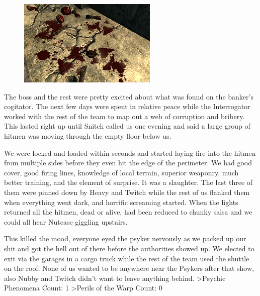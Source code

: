 \begin{figure}
	\begin{center}
		\includegraphics[width=\figwidth]{pics/3/11.png}
	\end{center}
\end{figure}
The boss and the rest were pretty excited about what was found on the banker’s cogitator. 
The next few days were spent in relative peace while the Interrogator worked with the rest of the team to map out a web of corruption and bribery. 
This lasted right up until Snitch called us one evening and said a large group of hitmen was moving through the empty floor below us.

We were locked and loaded within seconds and started laying fire into the hitmen from multiple sides before they even hit the edge of the perimeter. 
We had good cover, good firing lines, knowledge of local terrain, superior weaponry, much better training, and the element of surprise. 
It was a slaughter. 
The last three of them were pinned down by Heavy and Twitch while the rest of us flanked them when everything went dark, and horrific screaming started. 
When the lights returned all the hitmen, dead or alive, had been reduced to chunky salsa and we could all hear Nutcase giggling upstairs.

This killed the mood, everyone eyed the psyker nervously as we packed up our shit and got the hell out of there before the authorities showed up. 
We elected to exit via the garages in a cargo truck while the rest of the team used the shuttle on the roof. 
None of us wanted to be anywhere near the Psykers after that show, also Nubby and Twitch didn’t want to leave anything behind.
>Psychic Phenomena Count: 1
>Perils of the Warp Count: 0

